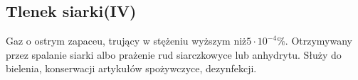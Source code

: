 \subsection{Tlenek siarki(IV) }
Gaz o ostrym zapaceu, trujący w stężeniu wyższym niż$5 \cdot 10^{-4} \%$.
Otrzymywany przez spalanie siarki albo prażenie rud siarczkowyce lub anhydrytu.
Służy do bielenia, konserwacji artykułów spożywczyce, dezynfekcji.
